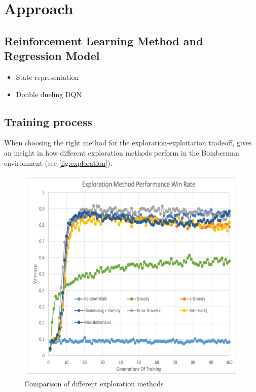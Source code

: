 \section{Approach} 
\label{approach}

\subsection{Reinforcement Learning Method and Regression Model} 
\label{ch:approachA}


\begin{itemize}
	\item State representation
	\item Double dueling DQN
\end{itemize}

\subsection{Training process} 
\label{ch:approachB}


When choosing the right method for the exploration-exploitation tradeoff, \cite{Kormelink2018} gives an insight in how different exploration methods perform in the Bomberman environment (see \autoref{fig:exploration}). 

\begin{figure}[ht]
	\centering
	\includegraphics[width=0.6\linewidth]{figures/exploration.PNG}
	\caption{Comparison of different exploration methods}
	\label{fig:exploration}
\end{figure}

